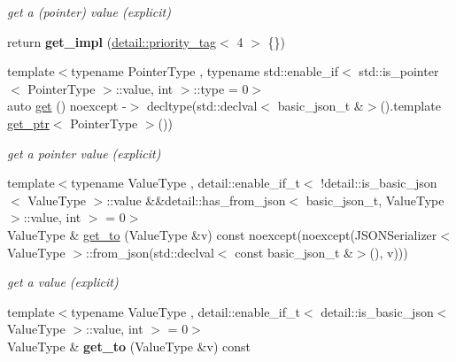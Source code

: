 \begin{DoxyCompactItemize}
\begin{DoxyCompactList}\small\item\em get a (pointer) value (explicit) \end{DoxyCompactList}\item 
\mbox{\label{classnlohmann_1_1basic__json_aa17b6729b79846fe460b6905eb8ece5f}} 
return {\bfseries get\+\_\+impl} (\hyperlink{structnlohmann_1_1detail_1_1priority__tag}{detail\+::priority\+\_\+tag}$<$ 4 $>$ \{\})
\item 
{\footnotesize template$<$typename Pointer\+Type , typename std\+::enable\+\_\+if$<$ std\+::is\+\_\+pointer$<$ Pointer\+Type $>$\+::value, int $>$\+::type  = 0$>$ }\\auto \hyperlink{classnlohmann_1_1basic__json_a46bb02ef17ee178984313efbc2c8eb8d}{get} () noexcept -\/$>$ decltype(std\+::declval$<$ basic\+\_\+json\+\_\+t \&$>$().template \hyperlink{classnlohmann_1_1basic__json_ac3698ce827dcd4f0c81455461709938d}{get\+\_\+ptr}$<$ Pointer\+Type $>$())
\begin{DoxyCompactList}\small\item\em get a pointer value (explicit) \end{DoxyCompactList}\item 
{\footnotesize template$<$typename Value\+Type , detail\+::enable\+\_\+if\+\_\+t$<$ !detail\+::is\+\_\+basic\+\_\+json$<$ Value\+Type $>$\+::value \&\&detail\+::has\+\_\+from\+\_\+json$<$ basic\+\_\+json\+\_\+t, Value\+Type $>$\+::value, int $>$  = 0$>$ }\\Value\+Type \& \hyperlink{classnlohmann_1_1basic__json_a95c3851acd53eccd620b0d82855c3da1}{get\+\_\+to} (Value\+Type \&v) const noexcept(noexcept(J\+S\+O\+N\+Serializer$<$ Value\+Type $>$\+::from\+\_\+json(std\+::declval$<$ const basic\+\_\+json\+\_\+t \&$>$(), v)))
\begin{DoxyCompactList}\small\item\em get a value (explicit) \end{DoxyCompactList}\item 
\mbox{\label{classnlohmann_1_1basic__json_ac6fd6c12364425e4007ee4d7ecf9fefd}} 
{\footnotesize template$<$typename Value\+Type , detail\+::enable\+\_\+if\+\_\+t$<$ detail\+::is\+\_\+basic\+\_\+json$<$ Value\+Type $>$\+::value, int $>$  = 0$>$ }\\Value\+Type \& {\bfseries get\+\_\+to} (Value\+Type \&v) const
\item 

\end{DoxyCompactItemize}
